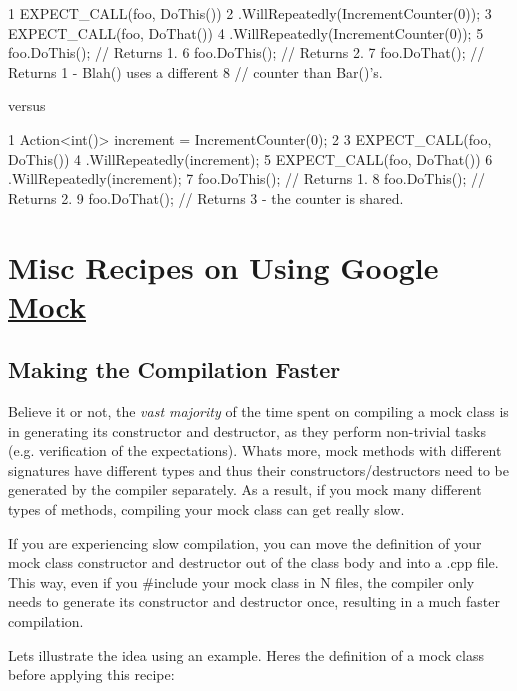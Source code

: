 \begin{DoxyCode}
1 EXPECT\_CALL(foo, DoThis())
2     .WillRepeatedly(IncrementCounter(0));
3 EXPECT\_CALL(foo, DoThat())
4     .WillRepeatedly(IncrementCounter(0));
5 foo.DoThis();  // Returns 1.
6 foo.DoThis();  // Returns 2.
7 foo.DoThat();  // Returns 1 - Blah() uses a different
8                // counter than Bar()'s.
\end{DoxyCode}


versus


\begin{DoxyCode}
1 Action<int()> increment = IncrementCounter(0);
2 
3 EXPECT\_CALL(foo, DoThis())
4     .WillRepeatedly(increment);
5 EXPECT\_CALL(foo, DoThat())
6     .WillRepeatedly(increment);
7 foo.DoThis();  // Returns 1.
8 foo.DoThis();  // Returns 2.
9 foo.DoThat();  // Returns 3 - the counter is shared.
\end{DoxyCode}


\section*{Misc Recipes on Using Google \hyperlink{class_mock}{Mock}}

\subsection*{Making the Compilation Faster}

Believe it or not, the {\itshape vast majority} of the time spent on compiling a mock class is in generating its constructor and destructor, as they perform non-\/trivial tasks (e.\+g. verification of the expectations). What\textquotesingle{}s more, mock methods with different signatures have different types and thus their constructors/destructors need to be generated by the compiler separately. As a result, if you mock many different types of methods, compiling your mock class can get really slow.

If you are experiencing slow compilation, you can move the definition of your mock class\textquotesingle{} constructor and destructor out of the class body and into a {\ttfamily .cpp} file. This way, even if you {\ttfamily \#include} your mock class in N files, the compiler only needs to generate its constructor and destructor once, resulting in a much faster compilation.

Let\textquotesingle{}s illustrate the idea using an example. Here\textquotesingle{}s the definition of a mock class before applying this recipe\+:



